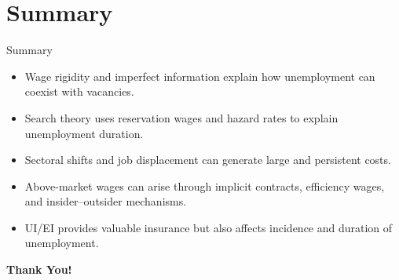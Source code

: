 \documentclass[aspectratio=169]{beamer}
\begin{document}
\section{Summary}

\begin{frame}{Summary}
\transfade
\begin{itemize}
  \item Wage rigidity and imperfect information explain how unemployment can coexist with vacancies.
  \item Search theory uses reservation wages and hazard rates to explain unemployment duration.
  \item Sectoral shifts and job displacement can generate large and persistent costs.
  \item Above-market wages can arise through implicit contracts, efficiency wages, and insider--outsider mechanisms.
  \item UI/EI provides valuable insurance but also affects incidence and duration of unemployment.
\end{itemize}


\end{frame}

\begin{frame}
\centering
\Huge{\textbf{Thank You!}}
\end{frame}
\end{document}
